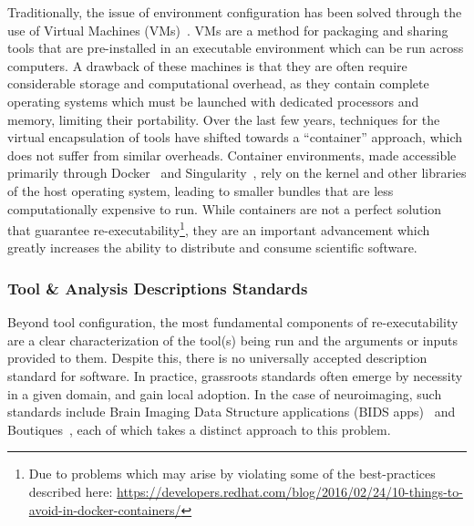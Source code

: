 Traditionally, the issue of environment configuration has been solved through the use of Virtual Machines
(VMs)~\cite{smith2005virtual}. VMs are a method for packaging and sharing tools that are pre-installed in an executable
environment which can be run across computers. A drawback of these machines is that they are often require considerable
storage and computational overhead, as they contain complete operating systems which must be launched with dedicated
processors and memory, limiting their portability. Over the last few years, techniques for the virtual encapsulation of
tools have shifted towards a ``container'' approach, which does not suffer from similar overheads. Container environments,
made accessible primarily through Docker~\cite{merkel2014docker} and Singularity~\cite{kurtzer2017singularity}, rely on
the kernel and other libraries of the host operating system, leading to smaller bundles that are less computationally
expensive to run. While containers are not a perfect solution that guarantee re-executability\footnote{Due to problems
which may arise by violating some of the best-practices described here:
\url{https://developers.redhat.com/blog/2016/02/24/10-things-to-avoid-in-docker-containers/}}, they are an important
advancement which greatly increases the ability to distribute and consume scientific software.

\subsubsection{Tool \& Analysis Descriptions Standards}
Beyond tool configuration, the most fundamental components of re-executability are a clear characterization of the
tool(s) being run and the arguments or inputs provided to them. Despite this, there is no universally accepted
description standard for software. In practice, grassroots standards often emerge by necessity in a given domain, and
gain local adoption. In the case of neuroimaging, such standards include Brain Imaging Data Structure applications
(BIDS apps)~\cite{gorgolewski2017bids} and Boutiques~\cite{Glatard2018-tu}, each of which takes a distinct approach to
this problem.

